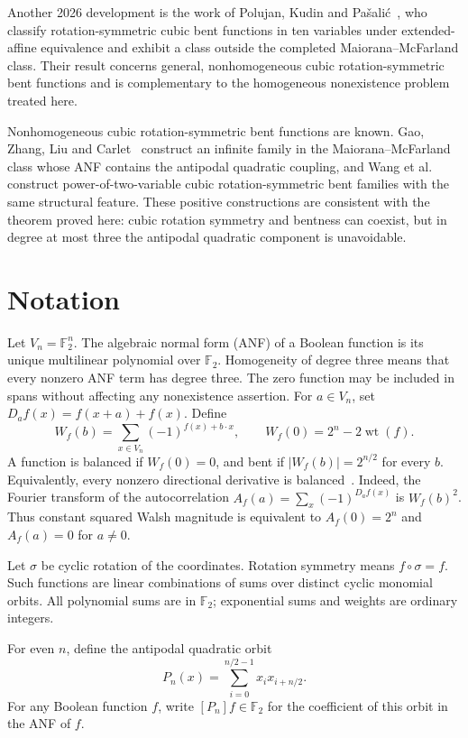 \documentclass[11pt,a4paper]{article}
\theoremstyle{remark}
\theoremstyle{plain}
\newcommand{\F}{\mathbb F_2}
\newcommand{\wt}{\operatorname{wt}}
\begin{document}
Another 2026 development is the work of Polujan, Kudin and Pa\v{s}ali\'c~\cite{polujan2026}, who classify rotation-symmetric cubic bent functions in ten variables under extended-affine equivalence and exhibit a class outside the completed Maiorana--McFarland class. Their result concerns general, nonhomogeneous cubic rotation-symmetric bent functions and is complementary to the homogeneous nonexistence problem treated here.

Nonhomogeneous cubic rotation-symmetric bent functions are known. Gao, Zhang, Liu and Carlet~\cite{gao2012} construct an infinite family in the Maiorana--McFarland class whose ANF contains the antipodal quadratic coupling, and Wang et al.~\cite{wang2015} construct power-of-two-variable cubic rotation-symmetric bent families with the same structural feature. These positive constructions are consistent with the theorem proved here: cubic rotation symmetry and bentness can coexist, but in degree at most three the antipodal quadratic component is unavoidable.

\section{Notation}
Let $V_n=\F^n$. The algebraic normal form (ANF) of a Boolean function is its unique multilinear polynomial over $\F$. Homogeneity of degree three means that every nonzero ANF term has degree three. The zero function may be included in spans without affecting any nonexistence assertion.
For $a\in V_n$, set $D_a f(x)=f(x+a)+f(x)$. Define
\[
 W_f(b)=\sum_{x\in V_n}(-1)^{f(x)+b\cdot x},\qquad
 W_f(0)=2^n-2\wt(f).
\]
A function is balanced if $W_f(0)=0$, and bent if $|W_f(b)|=2^{n/2}$ for every $b$. Equivalently, every nonzero directional derivative is balanced~\cite{rothaus}. Indeed, the Fourier transform of the autocorrelation $A_f(a)=\sum_x(-1)^{D_af(x)}$ is $W_f(b)^2$. Thus constant squared Walsh magnitude is equivalent to $A_f(0)=2^n$ and $A_f(a)=0$ for $a\ne0$.

Let $\sigma$ be cyclic rotation of the coordinates. Rotation symmetry means $f\circ\sigma=f$. Such functions are linear combinations of sums over distinct cyclic monomial orbits. All polynomial sums are in $\F$; exponential sums and weights are ordinary integers.

For even $n$, define the antipodal quadratic orbit
\[
P_n(x)=\sum_{i=0}^{n/2-1}x_i x_{i+n/2}.
\]
For any Boolean function $f$, write $[P_n]f\in\F$ for the coefficient of this orbit in the ANF of $f$.
\end{document}

